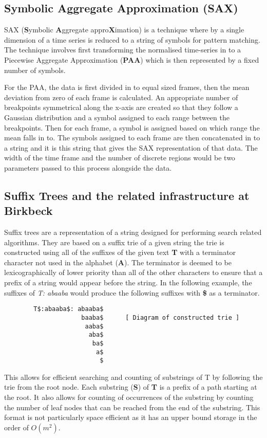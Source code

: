 \documentclass[11pt]{scrartcl}
\begin{document}
\subsection{Symbolic Aggregate Approximation (SAX)}
	SAX (\textbf{S}ymbolic \textbf{A}ggregate appro\textbf{X}imation) \citep{sax} is a technique where by a single dimension of a time series is reduced to a string of symbols for pattern matching.  The technique involves first transforming the normalised time-series in to a Piecewise Aggregate Approximation (\textbf{PAA}) which is then represented by a fixed number of symbols.
	
	For the PAA, the data is first divided in to equal sized frames, then the mean deviation from zero of each frame is calculated.  An appropriate number of breakpoints symmetrical along the x-axis are created so that they follow a Gaussian distribution and a symbol assigned to each range between the breakpoints.  Then for each frame, a symbol is assigned based on which range the mean falls in to.  The symbols assigned to each frame are then concatenated in to a string and it is this string that gives the SAX representation of that data.  The width of the time frame and the number of discrete regions would be two parameters passed to this process alongside the data.
	
\subsection{Suffix Trees and the related infrastructure at Birkbeck}
	Suffix trees are a representation of a string designed for performing search related algorithms.  They are based on a suffix trie of a given string the trie is constructed using all of the suffixes of the given text \textbf{T} with a terminator character not used in the alphabet (\textbf{A}).  The terminator is deemed to be lexicographically of lower priority than all of the other characters to ensure that a prefix of a string would appear before the string. In the following example, the suffixes of \textit{T: abaaba} would produce the following suffixes with \textbf{\$} as a terminator.
	\begin{verbatim}
		T$:abaaba$: abaaba$
		             baaba$      [ Diagram of constructed trie ]
		              aaba$
		               aba$
		                ba$
		                 a$
		                  $
	\end{verbatim}
	
	This allows for efficient searching and counting of substrings of T by following the trie from the root node.  Each substring (\textbf{S}) of \textbf{T} is a prefix of a path starting at the root.  It also allows for counting of occurrences of the substring by counting the number of leaf nodes that can be reached from the end of the substring.  This format is not particularly space efficient as it has an upper bound storage in the order of \textit{$O(m^{2})$}.
	
\end{document}

